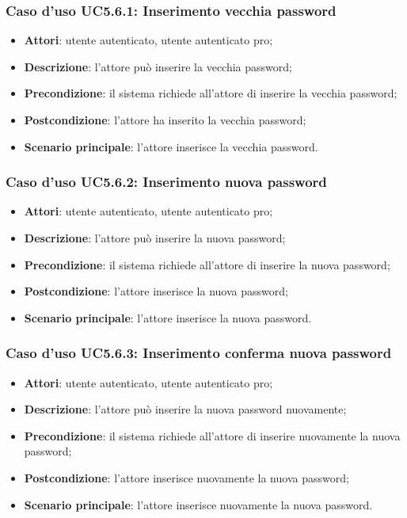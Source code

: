 \subsubsection{Caso d'uso UC5.6.1: Inserimento vecchia password}

\begin{itemize}
	\item \textbf{Attori}: utente autenticato, utente autenticato pro;
	\item \textbf{Descrizione}: l'attore può inserire la vecchia password;
	\item \textbf{Precondizione}: il sistema richiede all'attore di inserire la vecchia password;
	\item \textbf{Postcondizione}: l'attore ha inserito la vecchia password;
	\item \textbf{Scenario principale}: l'attore inserisce la vecchia password.
\end{itemize}

\subsubsection{Caso d'uso UC5.6.2: Inserimento nuova password}

\begin{itemize}
	\item \textbf{Attori}: utente autenticato, utente autenticato pro;
	\item \textbf{Descrizione}: l'attore può inserire la nuova password;
	\item \textbf{Precondizione}: il sistema richiede all'attore di inserire la nuova password;
	\item \textbf{Postcondizione}: l'attore inserisce la nuova password;
	\item \textbf{Scenario principale}: l'attore inserisce la nuova password.
\end{itemize}

\subsubsection{Caso d'uso UC5.6.3: Inserimento conferma nuova password}

\begin{itemize}
	\item \textbf{Attori}: utente autenticato, utente autenticato pro;
	\item \textbf{Descrizione}: l'attore può inserire la nuova password nuovamente;
	\item \textbf{Precondizione}: il sistema richiede all'attore di inserire nuovamente la nuova password;
	\item \textbf{Postcondizione}: l'attore inserisce nuovamente la nuova password;
	\item \textbf{Scenario principale}: l'attore inserisce nuovamente la nuova password.
\end{itemize}

